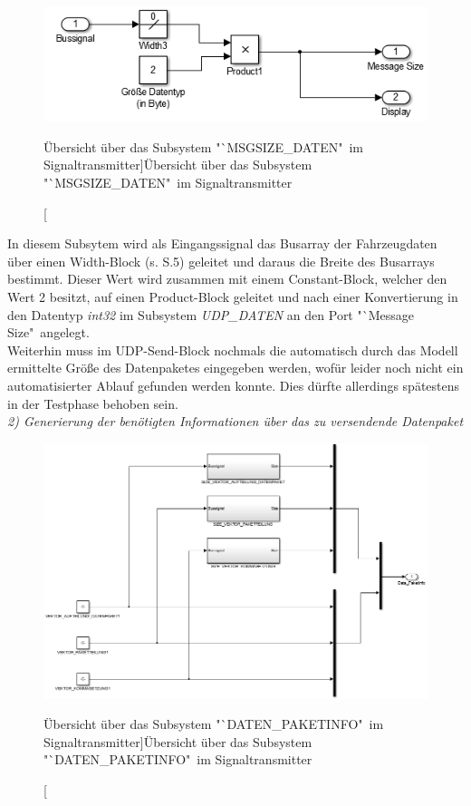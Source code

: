 \documentclass[fontsize = 12pt, paper = a4]{scrreprt}
\begin{document}
\newpage

\begin{figure}[h]
\centering
\includegraphics[scale = 0.75]{submsgsizedaten}
\caption[Übersicht über das Subsystem "`MSGSIZE\_DATEN"\ im Signaltransmitter]{Übersicht über das Subsystem "`MSGSIZE\_DATEN"\ im Signaltransmitter}
\label{submsgsizedaten}
\end{figure} 

In diesem Subsytem wird als Eingangssignal das Busarray der Fahrzeugdaten über einen Width-Block (s. S.5) geleitet und daraus die Breite des Busarrays bestimmt. Dieser Wert wird zusammen mit einem Constant-Block, welcher den Wert 2 besitzt, auf einen Product-Block geleitet und nach einer Konvertierung in den Datentyp \textit{int32} im Subsystem \textit{UDP\_DATEN} an den Port "`Message Size"\ angelegt. \\

Weiterhin muss im UDP-Send-Block nochmals die automatisch durch das Modell ermittelte Größe des Datenpaketes eingegeben werden, wofür leider noch nicht ein automatisierter Ablauf gefunden werden konnte. Dies dürfte allerdings spätestens in der Testphase behoben sein. \\



\textit{2) Generierung der benötigten Informationen über das zu versendende Datenpaket} \\

\begin{figure}[h]
\centering
\includegraphics[scale = 0.6]{subdatenpaketinfo}
\caption[Übersicht über das Subsystem "`DATEN\_PAKETINFO"\ im Signaltransmitter]{Übersicht über das Subsystem "`DATEN\_PAKETINFO"\ im Signaltransmitter}
\label{subdatenpaketinfo}
\end{figure} 
\end{document}
